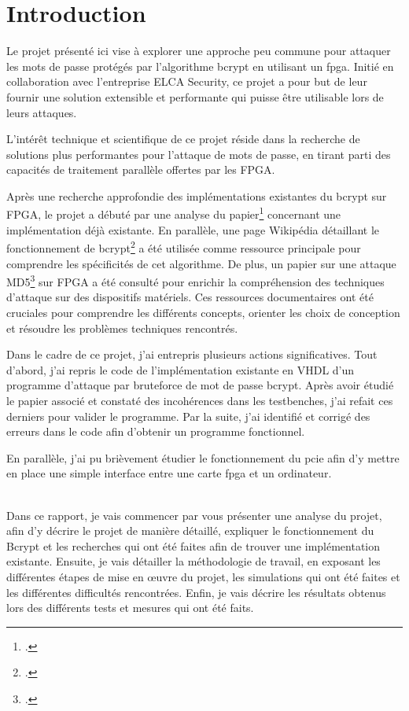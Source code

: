\chapter*{Introduction}


Le projet présenté ici vise à explorer une approche peu commune pour attaquer les mots de passe protégés par l'algorithme bcrypt en utilisant un \gls{fpga}. Initié en collaboration avec l'entreprise ELCA Security, ce projet a pour but de leur fournir une solution extensible et performante qui puisse être utilisable lors de leurs attaques.

L'intérêt technique et scientifique de ce projet réside dans la recherche de solutions plus performantes pour l'attaque de mots de passe, en tirant parti des capacités de traitement parallèle offertes par les FPGA.


Après une recherche approfondie des implémentations existantes du bcrypt sur FPGA, le projet a débuté par une analyse du papier\footcite{wiemer_high-speed_2014} concernant une implémentation déjà existante. En parallèle, une page Wikipédia détaillant le fonctionnement de bcrypt\footcite{noauthor_bcrypt_2024} a été utilisée comme ressource principale pour comprendre les spécificités de cet algorithme. De plus, un papier sur une attaque MD5\footcite{gillela_parallelization_2019} sur FPGA a été consulté pour enrichir la compréhension des techniques d'attaque sur des dispositifs matériels. Ces ressources documentaires ont été cruciales pour comprendre les différents concepts, orienter les choix de conception et résoudre les problèmes techniques rencontrés.

Dans le cadre de ce projet, j'ai entrepris plusieurs actions significatives. Tout d'abord, j'ai repris le code de l'implémentation existante en VHDL d'un programme d'attaque par bruteforce de mot de passe bcrypt. Après avoir étudié le papier associé et constaté des incohérences dans les testbenches, j'ai refait ces derniers pour valider le programme. Par la suite, j'ai identifié et corrigé des erreurs dans le code afin d'obtenir un programme fonctionnel.

En parallèle, j'ai pu brièvement étudier le fonctionnement du \gls{pcie} afin d'y mettre en place une simple interface entre une carte \gls{fpga} et un ordinateur.\\\


Dans ce rapport, je vais commencer par vous présenter une analyse du projet, afin d'y décrire le projet de manière détaillé, expliquer le fonctionnement du Bcrypt et les recherches qui ont été faites afin de trouver une implémentation existante. Ensuite, je vais détailler la méthodologie de travail, en exposant les différentes étapes de mise en œuvre du projet, les simulations qui ont été faites et les différentes difficultés rencontrées. Enfin, je vais décrire les résultats obtenus lors des différents tests et mesures qui ont été faits.
